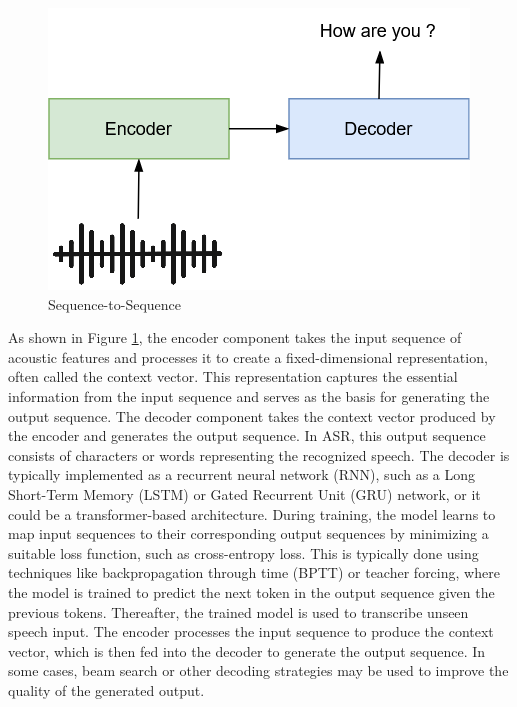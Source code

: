 \documentclass[preprint,12pt]{elsarticle}
\begin{document}
\begin{figure}[h!]
    \centering
    \includegraphics[scale=0.6]{fig_speech_seq2seq.png}
    \caption{Sequence-to-Sequence}
    \label{fig_speech_seq2seq}
\end{figure}

As shown in Figure \ref{fig_speech_seq2seq},  the encoder component takes the input sequence of acoustic features and processes it to create a fixed-dimensional representation, often called the context vector. This representation captures the essential information from the input sequence and serves as the basis for generating the output sequence. The decoder component takes the context vector produced by the encoder and generates the output sequence. In ASR, this output sequence consists of characters or words representing the recognized speech. The decoder is typically implemented as a recurrent neural network (RNN), such as a Long Short-Term Memory (LSTM) or Gated Recurrent Unit (GRU) network, or it could be a transformer-based architecture. During training, the model learns to map input sequences to their corresponding output sequences by minimizing a suitable loss function, such as cross-entropy loss. This is typically done using techniques like backpropagation through time (BPTT) or teacher forcing, where the model is trained to predict the next token in the output sequence given the previous tokens. Thereafter, the trained model is used to transcribe unseen speech input. The encoder processes the input sequence to produce the context vector, which is then fed into the decoder to generate the output sequence. In some cases, beam search \citep{szucbeamsearch2019, li2018seq2seq} or other decoding strategies may be used to improve the quality of the generated output.
\end{document}

